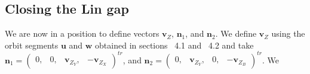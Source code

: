 \documentclass{ws-ijbc}
\begin{document}
\subsection{Closing the Lin gap}

We are now in a position to define vectors $\mathbf{v}_Z$, $\mathbf{n}_1$, and $\mathbf{n}_2$.  We define $\mathbf{v}_Z$ using the orbit segments $\mathbf{u}$ and $\mathbf{w}$ obtained in sections ~4.1 and ~4.2 and take $\mathbf{n}_1 = \begin{pmatrix} 0, & 0, & \mathbf{v}_{Z_Y}, & -\mathbf{v}_{Z_X} \end{pmatrix}^{tr}$, and $\mathbf{n}_2 = \begin{pmatrix} 0, & \mathbf{v}_{Z_Y}, & 0, & -\mathbf{v}_{Z_B} \end{pmatrix}^{tr}$.  We 
\end{document}
